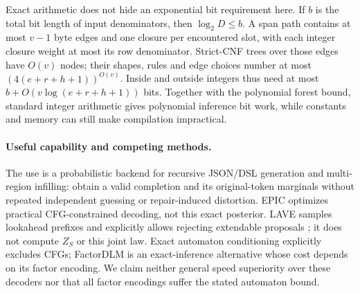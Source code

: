 Exact arithmetic does not hide an exponential bit requirement here. If $b$
is the total bit length of input denominators, then $\log_2 D\leq b$. A span
path contains at most $v-1$ byte edges and one closure per encountered slot,
with each integer closure weight at most its row denominator. Strict-CNF trees
over those edges have $O(v)$ nodes; their shapes, rules and edge choices number
at most $(4(e+r+h+1))^{O(v)}$. Inside and outside integers thus need at most
$b+O(v\log(e+r+h+1))$ bits. Together with the polynomial forest bound, standard
integer arithmetic gives polynomial inference bit work, while constants and memory can
still make compilation impractical.

\paragraph{Useful capability and competing methods.}
The use is a probabilistic backend for recursive JSON/DSL generation and
multi-region infilling: obtain a valid completion and its original-token
marginals without repeated independent guessing or repair-induced distortion.
EPIC optimizes practical CFG-constrained decoding, not this exact posterior.
LAVE samples lookahead prefixes and explicitly allows rejecting extendable
proposals \cite{zhang2026lave}; it does not compute $Z_S$ or this joint law.
Exact automaton conditioning \cite{dang2026automata} explicitly excludes CFGs;
FactorDLM \cite{su2026factor} is an exact-inference alternative whose cost depends
on its factor encoding. We claim neither general speed superiority over these
decoders nor that all factor encodings suffer the stated automaton bound.
